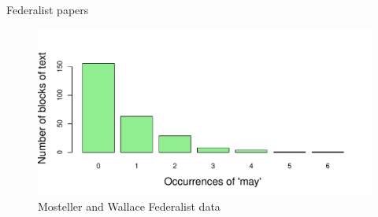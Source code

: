 \documentclass[11pt]{book}
\renewenvironment{knitrout}{\small\renewcommand{\baselinestretch}{.85}}{} %
\begin{document}
\begin{Example}[madison1]{Federalist papers}
\begin{knitrout}
\begin{figure}[!htbp]
\centerline{\includegraphics[width=.75\textwidth]{ch03/fig/federalist} }

\caption[Mosteller and Wallace Federalist data]{Mosteller and Wallace Federalist data\label{fig:federalist}}
\end{figure}


\end{knitrout}
\end{Example}
\end{document}
